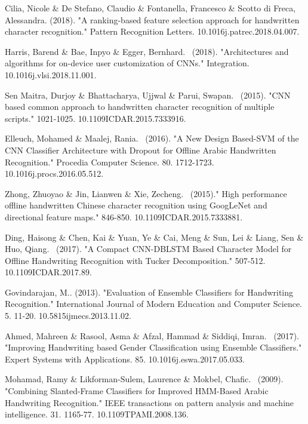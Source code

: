 \documentclass{article}
\begin{document}
\begin{thebibliography}{99}
   Cilia, Nicole \& De Stefano, Claudio \& Fontanella, Francesco \& Scotto di Freca, Alessandra. (2018). "A ranking-based feature selection approach for handwritten character recognition." Pattern Recognition Letters. 10.1016\/j.patrec.2018.04.007.

   Harris, Barend \& Bae, Inpyo \& Egger, Bernhard. \ (2018). "Architectures and algorithms for on-device user customization of CNNs." Integration. 10.1016\/j.vlsi.2018.11.001.

   Sen Maitra, Durjoy \& Bhattacharya, Ujjwal \& Parui, Swapan. \ (2015). "CNN based common approach to handwritten character recognition of multiple scripts." 1021-1025. 10.1109\/ICDAR.2015.7333916.

   Elleuch, Mohamed \& Maalej, Rania. \ (2016). "A New Design Based-SVM of the CNN Classifier Architecture with Dropout for Offline Arabic Handwritten Recognition." Procedia Computer Science. 80. 1712-1723. 10.1016\/j.procs.2016.05.512.

   Zhong, Zhuoyao \& Jin, Lianwen \& Xie, Zecheng. \ (2015)." High performance offline handwritten Chinese character recognition using GoogLeNet and directional feature maps." 846-850. 10.1109\/ICDAR.2015.7333881.

   Ding, Haisong \& Chen, Kai \& Yuan, Ye \& Cai, Meng \& Sun, Lei \& Liang, Sen \& Huo, Qiang. \ (2017). "A Compact CNN-DBLSTM Based Character Model for Offline Handwriting Recognition with Tucker Decomposition." 507-512. 10.1109\/ICDAR.2017.89.

   Govindarajan, M.. (2013). "Evaluation of Ensemble Classifiers for Handwriting Recognition." International Journal of Modern Education and Computer Science. 5. 11-20. 10.5815\/ijmecs.2013.11.02.

   Ahmed, Mahreen \& Rasool, Asma \& Afzal, Hammad \& Siddiqi, Imran. \ (2017). "Improving Handwriting based Gender Classification using Ensemble Classifiers." Expert Systems with Applications. 85. 10.1016\/j.eswa.2017.05.033.

   Mohamad, Ramy \& Likforman-Sulem, Laurence \& Mokbel, Chafic. \ (2009). "Combining Slanted-Frame Classifiers for Improved HMM-Based Arabic Handwriting Recognition." IEEE transactions on pattern analysis and machine intelligence. 31. 1165-77. 10.1109\/TPAMI.2008.136.
\end{thebibliography}
\end{document}
